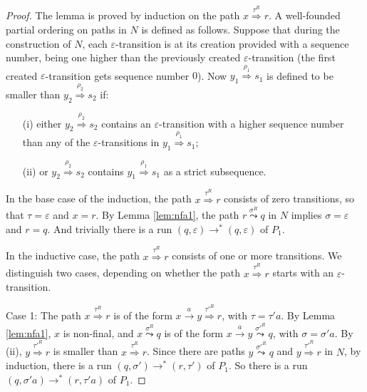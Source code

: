 \documentclass{llncs}
\newcommand{\eps}{\ensuremath{\varepsilon}}
\begin{document}
\begin{proof}
The lemma is proved by induction on the path $x\stackrel{\tau^R}{\Rightarrow}r$. A well-founded partial ordering on paths in $N$ is defined as follows.
Suppose that during the construction of $N$, each $\eps$-transition is at its creation provided with a sequence number, being one
higher than the previously created $\eps$-transition (the first created $\eps$-transition gets sequence number $0$).
Now $y_1\stackrel{\rho_1}{\Rightarrow}s_1$ is defined to be smaller than $y_2\stackrel{\rho_2}{\Rightarrow}s_2$ if:

\vspace*{-2mm}
\begin{itemize}
\item[(i)]
either $y_2\stackrel{\rho_2}{\Rightarrow}s_2$ contains an $\eps$-transition with a higher sequence number than any of the
$\eps$-transitions in $y_1\stackrel{\rho_1}{\Rightarrow}s_1$;
\item[(ii)]
or $y_2\stackrel{\rho_2}{\Rightarrow}s_2$ contains $y_1\stackrel{\rho_1}{\Rightarrow}s_1$ as a strict subsequence.
\end{itemize}

\vspace*{-2mm}

\noindent
In the base case of the induction, the path $x\stackrel{\tau^R}{\Rightarrow}r$ consists of zero transitions, so that $\tau=\eps$ and $x=r$.
By Lemma \ref{lem:nfa1}, the path $r\stackrel{\sigma^R}{\leadsto}q$ in $N$ implies $\sigma=\eps$ and $r=q$. And trivially there is a run
$(q,\eps)\rightarrow^*(q,\eps)$ of $P_1$.

In the inductive case, the path $x\stackrel{\tau^R}{\Rightarrow}r$ consists of one or more transitions.
We distinguish two cases, depending on whether the path $x\stackrel{\tau^R}{\Rightarrow}r$ starts with an $\eps$-transition.

\vspace{1mm}

\noindent
{\sc Case 1}: The path $x\stackrel{\tau^R}{\Rightarrow}r$ is of the form $x\stackrel{a}{\rightarrow}y\stackrel{\tau'^R}{\Rightarrow}r$, with $\tau=\tau' a$.
By Lemma \ref{lem:nfa1}, $x$ is non-final, and $x\stackrel{\sigma^R}{\leadsto}q$ is of the form $x\stackrel{a}{\rightarrow}y\stackrel{\sigma'^R}{\leadsto}q$,
with $\sigma=\sigma' a$.
By (ii), $y\stackrel{\tau'^R}{\Rightarrow}r$ is smaller than $x\stackrel{\tau^R}{\Rightarrow}r$.
Since there are paths $y\stackrel{\sigma'^R}{\leadsto}q$ and $y\stackrel{\tau'^R}{\Rightarrow}r$ in $N$,
by induction, there is a run $(q,\sigma')\rightarrow^*(r,\tau')$ of $P_1$.
So there is a run $(q,\sigma'a)\rightarrow^*(r,\tau'a)$ of $P_1$.


\end{proof}
\end{document}

